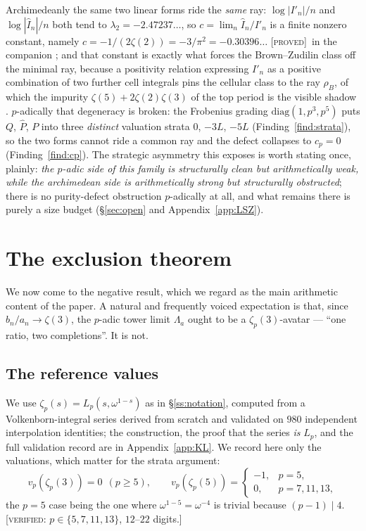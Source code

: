 \documentclass[11pt,reqno]{article}
\newcommand{\Ph}{\widehat{P}}
\newcommand{\Ih}{\widehat{I}}
\newcommand{\Ip}{I'}
\newcommand{\vp}{v_p}
\newcommand{\PROVED}{{\normalfont\textsc{[proved]}}}
\newcommand{\VER}[1]{{\normalfont\textsc{[verified:} #1\textsc{]}}}
\theoremstyle{plain}
\theoremstyle{definition}
\theoremstyle{remark}
\numberwithin{equation}{section}
\begin{document}
Archimedeanly the same two linear forms ride the \emph{same} ray: $\log|\Ip_n|/n$
and $\log|\Ih_n|/n$ both tend to $\lambda_2=-2.47237\dots$, so
$c=\lim_n\Ih_n/\Ip_n$ is a finite nonzero constant, namely
$c=-1/(2\zeta(2))=-3/\pi^2=-0.30396\dots$ \PROVED\ in the companion
\cite{PaperB-inprep}; and that constant is exactly what forces the
Brown--Zudilin class off the minimal ray, because a positivity relation
expressing $\Ip_n$ as a positive combination of two further cell integrals pins
the cellular class to the ray $\rho_B$, of which the impurity
$\zeta(5)+2\zeta(2)\zeta(3)$ of the top period is the visible shadow
\cite{PaperB-inprep}.  $p$-adically that degeneracy is
broken: the Frobenius grading $\mathrm{diag}(1,p^3,p^5)$ puts $Q$, $\Ph$, $P$
into three \emph{distinct} valuation strata $0$, $-3L$, $-5L$
(Finding~\ref{find:strata}), so the two forms cannot ride a common ray and the
defect collapses to $c_p=0$ (Finding~\ref{find:cp}).  The strategic asymmetry
this exposes is worth stating once, plainly: \emph{the $p$-adic side of this
family is structurally clean but arithmetically weak, while the archimedean side
is arithmetically strong but structurally obstructed}; there is no purity-defect
obstruction $p$-adically at all, and what remains there is purely a size budget
(\S\ref{sec:open} and Appendix~\ref{app:LSZ}).

\section{The exclusion theorem}\label{sec:exclusion}

We now come to the negative result, which we regard as the main arithmetic
content of the paper.  A natural and frequently voiced expectation is that,
since $b_n/a_n\to\zeta(3)$, the $p$-adic tower limit $\Lambda_a$ ought to be a
$\zeta_p(3)$-avatar --- ``one ratio, two completions''.  It is not.

\subsection{The reference values}\label{ss:refvals}

We use $\zeta_p(s)=L_p(s,\omega^{1-s})$ as in \S\ref{ss:notation}, computed from
a Volkenborn-integral series derived from scratch and validated on $980$
independent interpolation identities; the construction, the proof that the
series \emph{is} $L_p$, and the full validation record are in
Appendix~\ref{app:KL}.  We record here only the valuations, which matter for the
strata argument:
\[
  \vp(\zeta_p(3))=0\ \ (p\ge5),\qquad
  \vp(\zeta_p(5))=\begin{cases}-1,&p=5,\\ 0,&p=7,11,13,\end{cases}
\]
the $p=5$ case being the one where $\omega^{1-5}=\omega^{-4}$ is trivial because
$(p-1)\mid4$.  \VER{$p\in\{5,7,11,13\}$, $12$--$22$ digits.}
\end{document}
